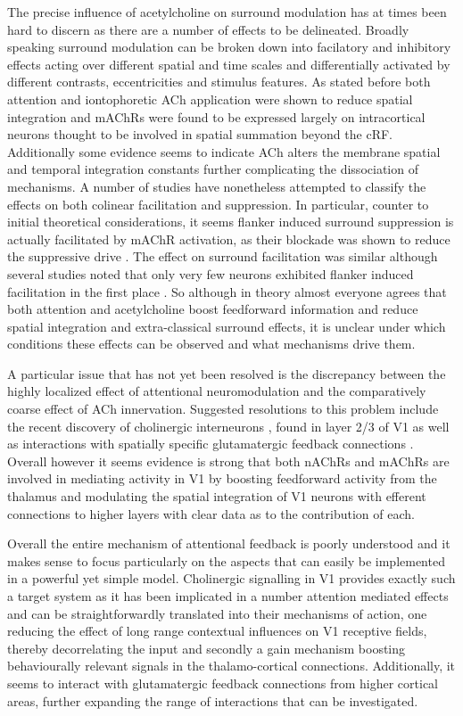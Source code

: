 The precise influence of acetylcholine on surround modulation has at
times been hard to discern as there are a number of effects to be
delineated. Broadly speaking surround modulation can be broken down
into facilatory and inhibitory effects acting over different spatial
and time scales and differentially activated by different contrasts,
eccentricities and stimulus features. As stated before both attention
and iontophoretic ACh application were shown to reduce spatial
integration \citep{Roberts2005,Roberts2007} and mAChRs were found to
be expressed largely on intracortical neurons thought to be involved
in spatial summation beyond the cRF. Additionally some evidence seems
to indicate ACh alters the membrane spatial and temporal integration
constants \citep{Lucas-Meunier2003} further complicating the
dissociation of mechanisms. A number of studies have nonetheless
attempted to classify the effects on both colinear facilitation and
suppression. In particular, counter to initial theoretical
considerations, it seems flanker induced surround suppression is
actually facilitated by mAChR activation, as their blockade was shown
to reduce the suppressive drive \citep{Herrero2011}. The effect on
surround facilitation was similar although several studies noted that
only very few neurons exhibited flanker induced facilitation in the
first place \citep{Pooresmaeili2010}. So although in theory almost
everyone agrees that both attention and acetylcholine boost
feedforward information and reduce spatial integration and
extra-classical surround effects, it is unclear under which conditions
these effects can be observed and what mechanisms drive them.

A particular issue that has not yet been resolved is the discrepancy
between the highly localized effect of attentional neuromodulation and
the comparatively coarse effect of ACh innervation. Suggested
resolutions to this problem include the recent discovery of
cholinergic interneurons \citep{vonEngelhardt2007}, found in layer 2/3
of V1 as well as interactions with spatially specific glutamatergic
feedback connections \citep{Herrero2008,Sarter2009}. Overall however
it seems evidence is strong that both nAChRs and mAChRs are involved
in mediating activity in V1 by boosting feedforward activity from the
thalamus and modulating the spatial integration of V1 neurons with
efferent connections to higher layers with clear data as to the
contribution of each.

Overall the entire mechanism of attentional feedback is poorly
understood and it makes sense to focus particularly on the aspects
that can easily be implemented in a powerful yet simple
model. Cholinergic signalling in V1 provides exactly such a target
system as it has been implicated in a number attention mediated
effects and can be straightforwardly translated into their mechanisms
of action, one reducing the effect of long range contextual influences
on V1 receptive fields, thereby decorrelating the input and secondly a
gain mechanism boosting behaviourally relevant signals in the
thalamo-cortical connections. Additionally, it seems to interact with
glutamatergic feedback connections from higher cortical areas, further
expanding the range of interactions that can be investigated.

